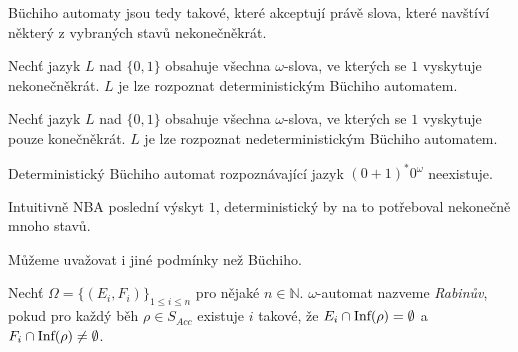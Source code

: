 Büchiho automaty jsou tedy takové, které akceptují právě slova, které
navštíví některý z vybraných stavů nekonečněkrát.

\begin{example}
    Nechť jazyk $L$ nad $\{0,1\}$ obsahuje všechna $\omega$-slova,
    ve kterých se $1$ vyskytuje nekonečněkrát.
    $L$ je lze rozpoznat deterministickým Büchiho automatem.

\begin{center}
\end{center}
\end{example}

\begin{example}
    Nechť jazyk $L$ nad $\{0,1\}$ obsahuje všechna $\omega$-slova, ve
    kterých se $1$ vyskytuje pouze konečněkrát.
    $L$ je lze rozpoznat nedeterministickým Büchiho automatem.

\begin{center}
\end{center}
\end{example}

\begin{claim}
    Deterministický Büchiho automat rozpoznávající jazyk
    $(0+1)^*0^\omega$ neexistuje.
\end{claim}

Intuitivně NBA  poslední výskyt $1$,
deterministický by na to potřeboval nekonečně mnoho stavů.

Můžeme uvažovat i jiné podmínky než Büchiho.

\begin{definition}
    Nechť $\Omega = \{(E_i, F_i)\}_{1 \leq i \leq n}$ pro nějaké
    $n \in \mathbb{N}$.
    $\omega$-automat nazveme {\em Rabinův},
    pokud pro každý běh $\rho \in S_{Acc}$
    existuje $i$ takové, že \linebreak
    $E_i \cap \text{Inf}(\rho) = \emptyset$
    a
    $F_i \cap \text{Inf}(\rho) \neq \emptyset$.
\end{definition}

